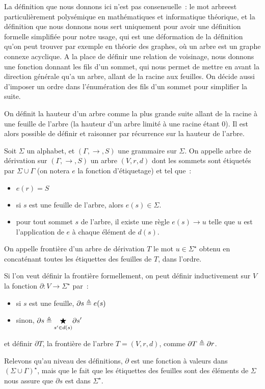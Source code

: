 \begin{remark}
  La définition que nous donnons ici n'est pas consensuelle~: le mot
  \og arbre\fg est particulièrement polysémique en mathématiques et informatique
  théorique, et la définition que nous donnons nous sert uniquement pour avoir
  une définition formelle simplifiée pour notre usage, qui est une déformation
  de la définition qu'on peut trouver par exemple en théorie des graphes, où un
  arbre est un graphe connexe acyclique. A la place de définir une relation de
  voisinage, nous donnons une fonction donnant les fils d'un sommet, qui nous
  permet de mettre en avant la direction générale qu'a un arbre, allant de la
  racine aux feuilles. On décide aussi d'imposer un ordre dans l'énumération des
  fils d'un sommet pour simplifier la suite.
\end{remark}

On définit la hauteur d'un arbre comme la plus grande suite allant de la racine
à une feuille de l'arbre (la hauteur d'un arbre limité à une racine étant $0$).
Il est alors possible de définir et raisonner par récurrence sur la hauteur de
l'arbre.

\begin{definition}
  Soit $\Sigma$ un alphabet, et $(\Gamma,\to,S)$ une grammaire sur $\Sigma$.
  On appelle arbre de dérivation sur $(\Gamma,\to,S)$ un arbre $(V,r,d)$ dont
  les sommets sont étiquetés par $\Sigma\cup\Gamma$ (on notera $e$ la fonction
  d'étiquetage) et tel que~:
  \begin{itemize}
  \item $e(r) = S$
  \item si $s$ est une feuille de l'arbre, alors $e(s) \in \Sigma$.
  \item pour tout sommet $s$ de l'arbre, il existe une règle $e(s) \to u$ telle
    que $u$ est l'application de $e$ à chaque élément de $d(s)$.
  \end{itemize}

  On appelle frontière d'un arbre de dérivation $T$ le mot
  $u \in \Sigma^\star$ obtenu en concaténant toutes les étiquettes
  des feuilles de $T$, dans l'ordre.
\end{definition}

\begin{remark}
  Si l'on veut définir la frontière formellement, on peut définir inductivement
  sur $V$ la fonction $\partial : V \to \Sigma^\star$ par~:
  \begin{itemize}
  \item si $s$ est une feuille, $\partial s \triangleq e(s)$
  \item sinon,
    $\displaystyle\partial s \triangleq \underset{{s' \in d(s)}}{\bigstar}
    \partial s'$
  \end{itemize}
  et définir $\partial T$, la frontière de l'arbre $T = (V,r,d)$, comme
  $\partial T \triangleq \partial r$.

  Relevons qu'au niveau des définitions, $\partial$ est une fonction à valeurs
  dans $(\Sigma\cup\Gamma)^\star$, mais que le fait que les étiquettes des
  feuilles sont des éléments de $\Sigma$ nous assure que $\partial s$ est
  dans $\Sigma^\star$.
\end{remark}

